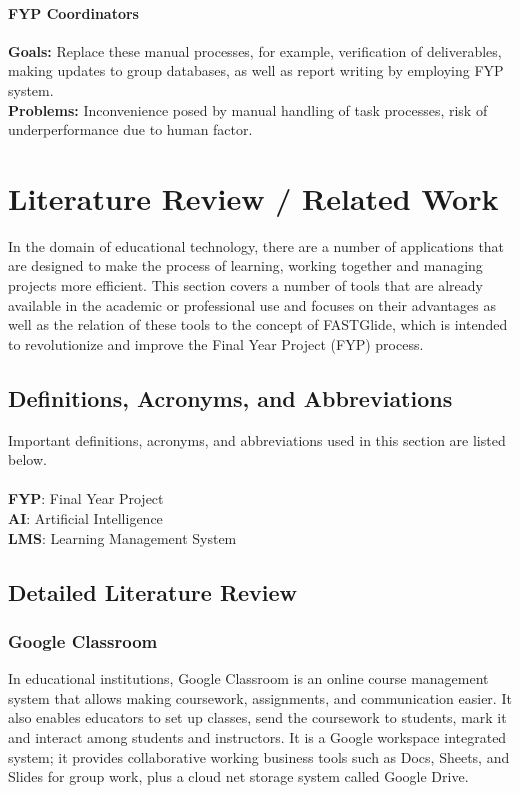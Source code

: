 \documentclass{FastFyp}
\begin{document}
\subsubsection{FYP Coordinators} 
\textbf{Goals:} Replace these manual processes, for example, verification of deliverables, making updates to group databases, as well as report writing by employing FYP system.
\\
\textbf{Problems:} Inconvenience posed by manual handling of task processes, risk of underperformance due to human factor.

\chapter{Literature Review / Related Work}
In the domain of educational technology, there are a number of applications that are designed to make the process of learning, working together and managing projects more efficient. This section covers a number of tools that are already available in the academic or professional use and focuses on their advantages as well as the relation of these tools to the concept of FASTGlide, which is intended to revolutionize and improve the Final Year Project (FYP) process.
\section{Definitions, Acronyms, and Abbreviations}
Important definitions, acronyms, and abbreviations used in this section are listed below.\\ \\
\textbf{FYP}: Final Year Project\\
\textbf{AI}: Artificial Intelligence\\
\textbf{LMS}: Learning Management System
\section{Detailed Literature Review}
\subsection{Google Classroom}
In educational institutions, Google Classroom \cite{ref:classroom} is an online course management system that allows making coursework, assignments, and communication easier. It also enables educators to set up classes, send the coursework to students, mark it and interact among students and instructors. It is a Google workspace integrated system; it provides collaborative working business tools such as Docs, Sheets, and Slides for group work, plus a cloud net storage system called Google Drive.
\end{document}
